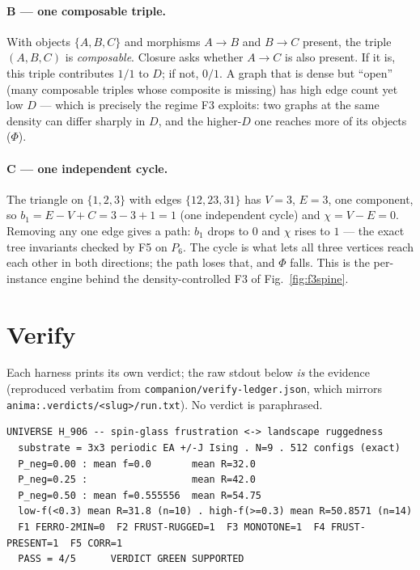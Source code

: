 \documentclass[11pt,a4paper]{article}
\begin{document}
\paragraph{B --- one composable triple.}
With objects $\{A,B,C\}$ and morphisms $A\to B$ and $B\to C$ present, the triple
$(A,B,C)$ is \emph{composable}. Closure asks whether $A\to C$ is also present. If
it is, this triple contributes $1/1$ to $D$; if not, $0/1$. A graph that is dense
but ``open'' (many composable triples whose composite is missing) has high edge
count yet low $D$ --- which is precisely the regime F3 exploits: two graphs at
the same density can differ sharply in $D$, and the higher-$D$ one reaches more
of its objects ($\Phi$).

\paragraph{C --- one independent cycle.}
The triangle on $\{1,2,3\}$ with edges $\{12,23,31\}$ has $V{=}3$, $E{=}3$, one
component, so $b_1 = E - V + C = 3 - 3 + 1 = 1$ (one independent cycle) and
$\chi = V - E = 0$. Removing any one edge gives a path: $b_1$ drops to $0$ and
$\chi$ rises to $1$ --- the exact tree invariants checked by F5 on $P_6$. The
cycle is what lets all three vertices reach each other in both directions; the
path loses that, and $\Phi$ falls. This is the per-instance engine behind the
density-controlled F3 of Fig.~\ref{fig:f3spine}.

\section{Verify}
\label{sec:verify}

Each harness prints its own verdict; the raw stdout below \emph{is} the evidence
(reproduced verbatim from \texttt{companion/verify-ledger.json}, which mirrors
\texttt{anima:.verdicts/<slug>/run.txt}). No verdict is paraphrased.

\begin{lstlisting}[basicstyle=\ttfamily\scriptsize,frame=single,xleftmargin=0pt]
UNIVERSE H_906 -- spin-glass frustration <-> landscape ruggedness
  substrate = 3x3 periodic EA +/-J Ising . N=9 . 512 configs (exact)
  P_neg=0.00 : mean f=0.0       mean R=32.0
  P_neg=0.25 :                  mean R=42.0
  P_neg=0.50 : mean f=0.555556  mean R=54.75
  low-f(<0.3) mean R=31.8 (n=10) . high-f(>=0.3) mean R=50.8571 (n=14)
  F1 FERRO-2MIN=0  F2 FRUST-RUGGED=1  F3 MONOTONE=1  F4 FRUST-PRESENT=1  F5 CORR=1
  PASS = 4/5      VERDICT GREEN SUPPORTED
\end{lstlisting}
\end{document}

